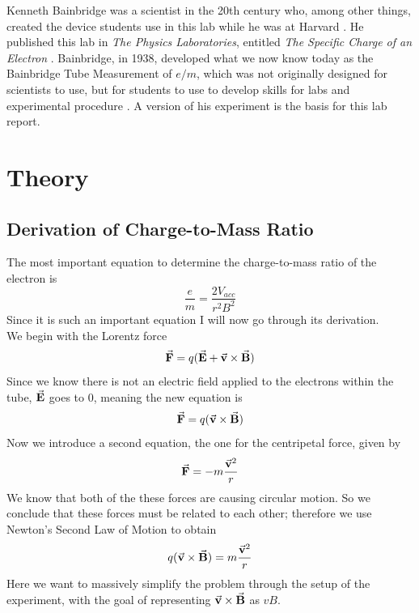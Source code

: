 \documentclass[aps,prl,10pt,twocolumn,floatfix]{revtex4-2}
\begin{document}
Kenneth Bainbridge was a scientist in the 20th century who, among other things, created the device students use in this lab while he was at Harvard \cite{Bainbridge}.
He published this lab in \textit{The Physics Laboratories}, entitled \textit{The Specific Charge of an Electron} \cite{Bainbridge}.
Bainbridge, in 1938, developed what we now know today as the Bainbridge Tube Measurement of $e/m$, which was not originally designed for scientists to use, but for students to use to develop skills for labs and experimental procedure \cite{Bainbridge}.
A version of his experiment is the basis for this lab report.


\section{Theory}\label{Theory}
\subsection{Derivation of Charge-to-Mass Ratio}
The most important equation to determine the charge-to-mass ratio of the electron is
\begin{equation}\label{pears}
\frac{e}{m}=\frac{2V_{acc}}{r^2B^2}
\end{equation}
Since it is such an important equation I will now go through its derivation. \\
We begin with the Lorentz force
\begin{equation}
\va{F}=q(\va{E}+\va{v}\times \va{B})
\end{equation}
Since we know there is not an electric field applied to the electrons within the tube, $\va{E}$ goes to 0, meaning the new equation is
\begin{equation*}
\va{F}=q(\va{v}\times \va{B})
\end{equation*}
Now we introduce a second equation, the one for the centripetal force, given by
\begin{equation*}
\va{F}=-m\frac{\va{v}^2}{r}
\end{equation*}
We know that both of the these forces are causing circular motion.
So we conclude that these forces must be related to each other;
therefore we use Newton's Second Law of Motion to obtain
\begin{equation}\label{apples}
q(\va{v}\times \va{B})=m\frac{\va{v}^2}{r}
\end{equation}
Here we want to massively simplify the problem through the setup of the experiment, with the goal of representing $\va{v}\times \va{B}$ as $vB$.
\end{document}
